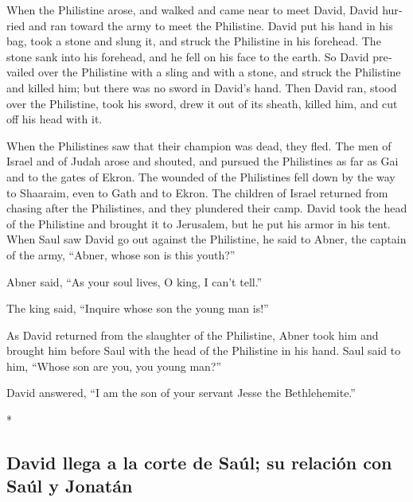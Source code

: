 \begin{paracol}{2}
\begin{otherlanguage}{english}
 When the Philistine arose, and walked and came near to
meet David, David hurried and ran toward the army to meet the
Philistine.  David put his hand in his bag, took a stone
and slung it, and struck the Philistine in his forehead. The stone sank
into his forehead, and he fell on his face to the earth. 
So David prevailed over the Philistine with a sling and with a stone,
and struck the Philistine and killed him; but there was no sword in
David's hand.  Then David ran, stood over the Philistine,
took his sword, drew it out of its sheath, killed him, and cut off his
head with it.

When the Philistines saw that their champion was dead, they fled.
 The men of Israel and of Judah arose and shouted, and
pursued the Philistines as far as Gai and to the gates of Ekron. The
wounded of the Philistines fell down by the way to Shaaraim, even to
Gath and to Ekron.  The children of Israel returned from
chasing after the Philistines, and they plundered their camp.
 David took the head of the Philistine and brought it to
Jerusalem, but he put his armor in his tent.  When Saul
saw David go out against the Philistine, he said to Abner, the captain
of the army, ``Abner, whose son is this youth?''

Abner said, ``As your soul lives, O king, I can't tell.''

 The king said, ``Inquire whose son the young man is!''

 As David returned from the slaughter of the Philistine,
Abner took him and brought him before Saul with the head of the
Philistine in his hand.  Saul said to him, ``Whose son
are you, you young man?''

David answered, ``I am the son of your servant Jesse the Bethlehemite.''

\end{otherlanguage}

\switchcolumn[0]*

\hypertarget{david-llega-a-la-corte-de-sauxfal-su-relaciuxf3n-con-sauxfal-y-jonatuxe1n}{%
\subsection{David llega a la corte de Saúl; su relación con Saúl y
Jonatán}\label{david-llega-a-la-corte-de-sauxfal-su-relaciuxf3n-con-sauxfal-y-jonatuxe1n}}


\end{paracol}
